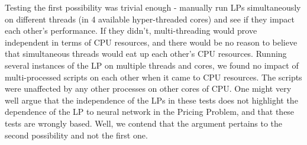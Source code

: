 Testing the first possibility was trivial enough - manually run LPs simultaneously on different threads (in 4 available hyper-threaded cores) and see if they impact each other's performance. If they didn't, multi-threading would prove independent in terms of CPU resources, and there would be no reason to believe that simultaneous threads would eat up each other's CPU resources. Running several instances of the LP on multiple threads and cores, we found no impact of multi-processed scripts on each other when it came to CPU resources. The scripts were unaffected by any other processes on other cores of CPU. One might very well argue that the independence of the LPs in these tests does not highlight the dependence of the LP to neural network in the Pricing Problem, and that these tests are wrongly based. Well, we contend that the argument pertains to the second possibility and not the first one. 

